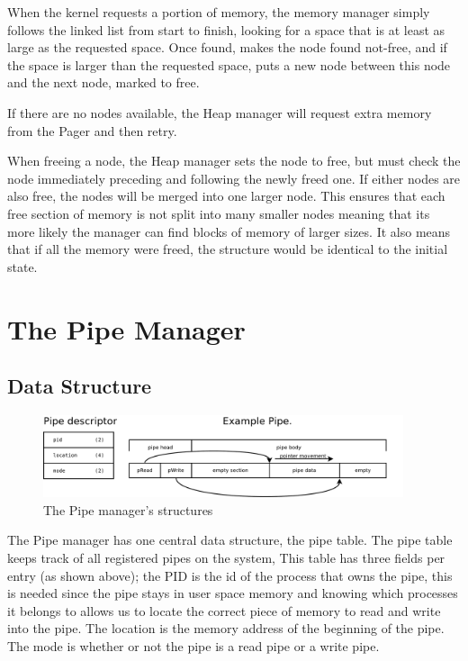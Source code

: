 \documentclass[a4paper]{report}
\begin{document}
When the kernel requests a portion of memory, the memory manager simply follows the linked list from start to finish, looking for a space that is at least as large as the requested space. Once found, makes the node found not-free, and if the space is larger than the requested space, puts a new node between this node and the next node, marked to free.

If there are no nodes available, the Heap manager will request extra memory from the Pager and then retry.

When freeing a node, the Heap manager sets the node to free, but must check the node immediately preceding and following the newly freed one. If either nodes are also free, the nodes will be merged into one larger node. This ensures that each free section of memory is not split into many smaller nodes meaning that its more likely the manager can find blocks of memory of larger sizes. It also means that if all the memory were freed, the structure would be identical to the initial state.
















\section{The Pipe Manager}

\subsection{Data Structure}

\begin{figure}[ht]
\centering
\includegraphics[width=400px]{images/Pipe_Manager}
\caption{The Pipe manager's structures}
\label{fig:WinTitleBarScreen}
\end{figure}



The Pipe manager has one central data structure, the pipe table. The pipe table keeps track of all registered pipes on the system, This table has three fields per entry (as shown above); the PID is the id of the process that owns the pipe, this is needed since the pipe stays in user space memory and knowing which processes it belongs to allows us to locate the correct piece of memory to read and write into the pipe. The location is the memory address of the beginning of the pipe. The mode is whether or not the pipe is a read pipe or a write pipe.
\end{document}
